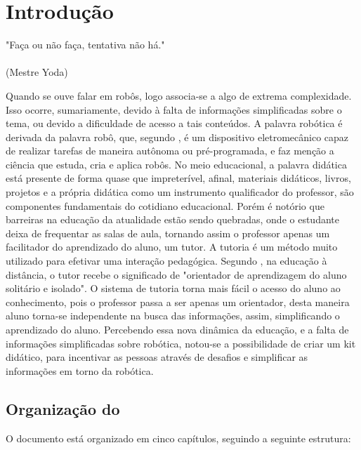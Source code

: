 \chapter{Introdução}
\label{chap:intro}
\begin{flushright}
	"Faça ou não faça, tentativa não há." \\
	\ \\
	(Mestre Yoda)
\end{flushright}

Quando se ouve falar em robôs, logo associa-se a algo de extrema complexidade. Isso ocorre, sumariamente, devido à falta de informações simplificadas sobre o tema, ou devido a dificuldade de acesso a tais conteúdos. A palavra robótica é derivada da palavra robô, que, segundo \cite{goncalves2007}, é um dispositivo eletromecânico capaz de realizar tarefas de maneira autônoma ou pré-programada, e faz menção a ciência que estuda, cria e aplica robôs. 
No meio educacional, a palavra didática está presente de forma quase que impreterível, afinal, materiais didáticos, livros, projetos e a própria didática como um instrumento qualificador do professor, são componentes fundamentais do cotidiano educacional. Porém é notório que barreiras na educação da atualidade estão sendo quebradas, onde o estudante deixa de frequentar as salas de aula, tornando assim o professor apenas um facilitador do aprendizado do aluno, um tutor. A tutoria é um método muito utilizado para efetivar uma interação pedagógica. Segundo \cite{sa1998}, na educação à distância, o tutor recebe o significado de "orientador de aprendizagem do aluno solitário e isolado".
O sistema de tutoria torna mais fácil o acesso do aluno ao conhecimento, pois o professor passa a ser apenas um orientador, desta maneira aluno torna-se independente na busca das informações, assim, simplificando o aprendizado do aluno. Percebendo essa nova dinâmica da educação, e a falta de informações simplificadas sobre robótica, notou-se a possibilidade de criar um kit didático, para incentivar as pessoas através de desafios e simplificar as informações em torno da robótica.




\section{Organização do \thetypework}
\label{section:organizacao}
O documento está organizado em cinco capítulos, seguindo a seguinte estrutura:

